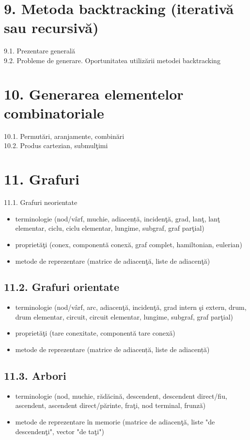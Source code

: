 \documentclass[10pt]{article}
\begin{document}
\section*{9. Metoda backtracking (iterativă sau recursivă)}
9.1. Prezentare generală\\
9.2. Probleme de generare. Oportunitatea utilizării metodei backtracking

\section*{10. Generarea elementelor combinatoriale}
10.1. Permutări, aranjamente, combinări\\
10.2. Produs cartezian, submulţimi

\section*{11. Grafuri}
11.1. Grafuri neorientate

\begin{itemize}
  \item terminologie (nod/vârf, muchie, adiacență, incidenţă, grad, lanţ, lanţ elementar, ciclu, ciclu elementar, lungime, subgraf, graf parţial)
  \item proprietăţi (conex, componentă conexă, graf complet, hamiltonian, eulerian)
  \item metode de reprezentare (matrice de adiacenţă, liste de adiacenţă)
\end{itemize}

\subsection*{11.2. Grafuri orientate}
\begin{itemize}
  \item terminologie (nod/vârf, arc, adiacenţă, incidenţă, grad intern şi extern, drum, drum elementar, circuit, circuit elementar, lungime, subgraf, graf parţial)
  \item proprietăţi (tare conexitate, componentă tare conexă)
  \item metode de reprezentare (matrice de adiacență, liste de adiacență)
\end{itemize}

\subsection*{11.3. Arbori}
\begin{itemize}
  \item terminologie (nod, muchie, rădăcină, descendent, descendent direct/fiu, ascendent, ascendent direct/părinte, fraţi, nod terminal, frunză)
  \item metode de reprezentare în memorie (matrice de adiacenţă, liste "de descendenţi", vector "de taţi")
\end{itemize}
\end{document}
